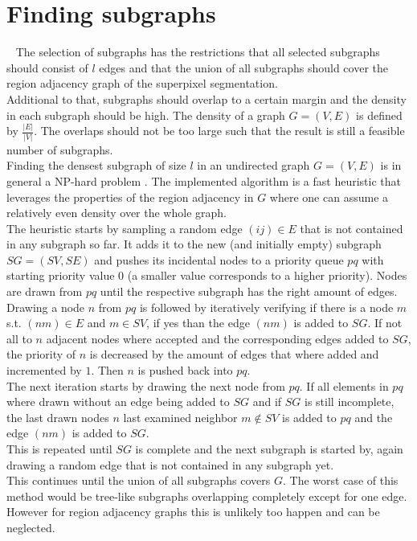 \section{Finding subgraphs}~\label{seg:sag_gcn}
The selection of subgraphs has the restrictions that all selected subgraphs should consist of $l$ edges and that the union of all subgraphs should cover the region adjacency graph of the superpixel segmentation.\\
Additional to that, subgraphs should overlap to a certain margin and the density in each subgraph should be high. The density of a graph $G=(V,E)$ is defined by $\frac{|E|}{|V|}$. The overlaps should not be too large such that the result is still a feasible number of subgraphs. \\
Finding the densest subgraph of size $l$ in an undirected graph $G=(V,E)$ is in general a NP-hard problem \cite{densestSg}. The implemented algorithm is a fast heuristic that leverages the properties of the region adjacency in $G$ where one can assume a relatively even density over the whole graph.\\
The heuristic starts by sampling a random edge $(ij)\in E$ that is not contained in any subgraph so far. It adds it to the new (and initially empty) subgraph $SG=(SV,SE)$ and pushes its incidental nodes to a priority queue $pq$ with starting priority value $0$ (a smaller value corresponds to a higher priority). Nodes are drawn from $pq$ until the respective subgraph has the right amount of edges.\\
Drawing a node $n$ from $pq$ is followed by iteratively verifying if there is a node $m$ s.t. $(nm)\in E$ and $m\in SV$, if yes than the edge $(nm)$ is added to $SG$. If not all to $n$ adjacent nodes where accepted and the corresponding edges added to $SG$, the priority of $n$ is decreased by the amount of edges that where added and incremented by $1$. Then $n$ is pushed back into $pq$.\\
The next iteration starts by drawing the next node from $pq$. If all elements in $pq$ where drawn without an edge being added to $SG$ and if $SG$ is still incomplete, the last drawn nodes $n$ last examined neighbor $m \not\in SV$ is added to $pq$ and  the edge $(nm)$ is added to $SG$.\\
This is repeated until $SG$ is complete and the next subgraph is started by, again drawing a random edge that is not contained in any subgraph yet.\\
This continues until the union of all subgraphs covers $G$. The worst case of this method would be tree-like subgraphs overlapping completely except for one edge. However for region adjacency graphs this is unlikely too happen and can be neglected.\\
